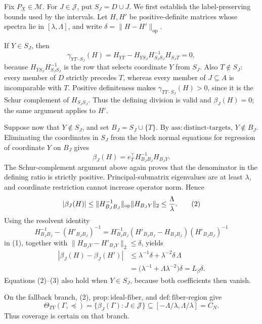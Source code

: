 Fix \(P_X\in\mathcal M\).  For \(J\in\mathcal J\), put \(S_J=D\cup J\).  We first establish the label-preserving bounds used by the intervals.  Let \(H,H'\) be positive-definite matrices whose spectra lie in \([\lambda,\Lambda]\), and write \(\delta=\|H-H'\|_{\mathrm{op}}\).

If \(Y\in S_J\), then
\[
 \gamma_{YT\cdot S_J}(H)
 =H_{YT}-H_{YS_J}H_{S_JS_J}^{-1}H_{S_JT}=0,
\]
because \(H_{YS_J}H_{S_JS_J}^{-1}\) is the row that selects coordinate \(Y\) from \(S_J\).  Also \(T\notin S_J\): every member of \(D\) strictly precedes \(T\), whereas every member of \(J\subseteq A\) is incomparable with \(T\).  Positive definiteness makes \(\gamma_{TT\cdot S_J}(H)>0\), since it is the Schur complement of \(H_{S_JS_J}\).  Thus the defining division is valid and \(\beta_J(H)=0\); the same argument applies to \(H'\).

Suppose now that \(Y\notin S_J\), and set \(B_J=S_J\cup\{T\}\).  By \(\mathrm{ass:distinct\text{-}targets}\), \(Y\notin B_J\).  Eliminating the coordinates in \(S_J\) from the block normal equations for regression of coordinate \(Y\) on \(B_J\) gives
\[
 \beta_J(H)=e_T^\top H_{B_JB_J}^{-1}H_{B_JY}. \tag{1}
\]
The Schur-complement argument above again proves that the denominator in the defining ratio is strictly positive.  Principal-submatrix eigenvalues are at least \(\lambda\), and coordinate restriction cannot increase operator norm.  Hence
\[
 |\beta_J(H)|
 \le \|H_{B_JB_J}^{-1}\|_{\mathrm{op}}\|H_{B_JY}\|_2
 \le {\Lambda\over\lambda}. \tag{2}
\]
Using the resolvent identity
\[
 H_{B_JB_J}^{-1}-(H'_{B_JB_J})^{-1}
 =H_{B_JB_J}^{-1}(H'_{B_JB_J}-H_{B_JB_J})(H'_{B_JB_J})^{-1}
\]
in (1), together with \(\|H_{B_JY}-H'_{B_JY}\|_2\le\delta\), yields
\[
 \begin{aligned}
 |\beta_J(H)-\beta_J(H')|
 &\le \lambda^{-1}\delta+\lambda^{-2}\delta\,\Lambda\\
 &=\bigl(\lambda^{-1}+\Lambda\lambda^{-2}\bigr)\delta
 =L_\beta\delta. 
 \end{aligned} \tag{3}
\]
Equations (2)--(3) also hold when \(Y\in S_J\), because both coefficients then vanish.

On the fallback branch, (2), \(\mathrm{prop:ideal\text{-}fiber}\), and \(\mathrm{def:fiber\text{-}region}\) give
\[
 \Theta_{TY}(\Gamma,\preceq)
 =\{\beta_J(\Gamma):J\in\mathcal J\}
 \subseteq[-\Lambda/\lambda,\Lambda/\lambda]=C_N. \tag{4}
\]
Thus coverage is certain on that branch.

